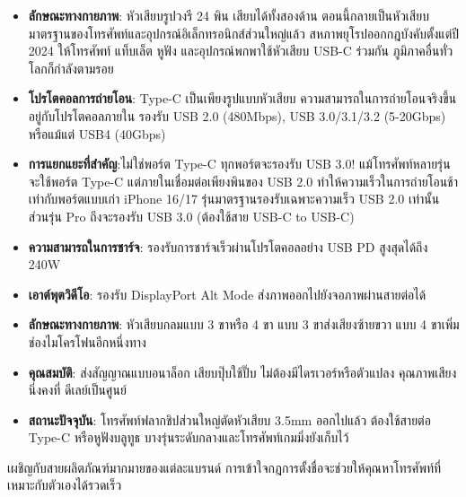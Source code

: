 \begin{itemize}
  \item \textbf{ลักษณะทางกายภาพ}: หัวเสียบรูปวงรี 24 พิน เสียบได้ทั้งสองด้าน ตอนนี้กลายเป็นหัวเสียบมาตรฐานของโทรศัพท์และอุปกรณ์อิเล็กทรอนิกส์ส่วนใหญ่แล้ว สหภาพยุโรปออกกฎบังคับตั้งแต่ปี 2024 ให้โทรศัพท์ แท็บเล็ต หูฟัง และอุปกรณ์พกพาใช้หัวเสียบ USB-C ร่วมกัน ภูมิภาคอื่นทั่วโลกก็กำลังตามรอย
  \item \textbf{โปรโตคอลการถ่ายโอน}: Type-C เป็นเพียงรูปแบบหัวเสียบ ความสามารถในการถ่ายโอนจริงขึ้นอยู่กับโปรโตคอลภายใน รองรับ USB 2.0 (480Mbps), USB 3.0/3.1/3.2 (5-20Gbps) หรือแม้แต่ USB4 (40Gbps)
  \item \textbf{การแยกแยะที่สำคัญ}:ไม่ใช่พอร์ต Type-C ทุกพอร์ตจะรองรับ USB 3.0! แม้โทรศัพท์หลายรุ่นจะใช้พอร์ต Type-C แต่ภายในเชื่อมต่อเพียงพินของ USB 2.0 ทำให้ความเร็วในการถ่ายโอนช้าเท่ากับพอร์ตแบบเก่า iPhone 16/17 รุ่นมาตรฐานรองรับเฉพาะความเร็ว USB 2.0 เท่านั้น ส่วนรุ่น Pro ถึงจะรองรับ USB 3.0 (ต้องใช้สาย USB-C to USB-C)
  \item \textbf{ความสามารถในการชาร์จ}: รองรับการชาร์จเร็วผ่านโปรโตคอลอย่าง USB PD สูงสุดได้ถึง 240W
  \item \textbf{เอาต์พุตวิดีโอ}: รองรับ DisplayPort Alt Mode ส่งภาพออกไปยังจอภาพผ่านสายต่อได้
\end{itemize}


\begin{itemize}
  \item \textbf{ลักษณะทางกายภาพ}: หัวเสียบกลมแบบ 3 ขาหรือ 4 ขา แบบ 3 ขาส่งเสียงซ้ายขวา แบบ 4 ขาเพิ่มช่องไมโครโฟนอีกหนึ่งทาง
  \item \textbf{คุณสมบัติ}: ส่งสัญญาณแบบอนาล็อก เสียบปุ๊บใช้ปั๊บ ไม่ต้องมีไดรเวอร์หรือตัวแปลง คุณภาพเสียงนิ่งคงที่ ดีเลย์เป็นศูนย์
  \item \textbf{สถานะปัจจุบัน}: โทรศัพท์ฟลากชิปส่วนใหญ่ตัดหัวเสียบ 3.5mm ออกไปแล้ว ต้องใช้สายต่อ Type-C หรือหูฟังบลูทูธ บางรุ่นระดับกลางและโทรศัพท์เกมมิ่งยังเก็บไว้
\end{itemize}


เผชิญกับสายผลิตภัณฑ์มากมายของแต่ละแบรนด์ การเข้าใจกฎการตั้งชื่อจะช่วยให้คุณหาโทรศัพท์ที่เหมาะกับตัวเองได้รวดเร็ว


